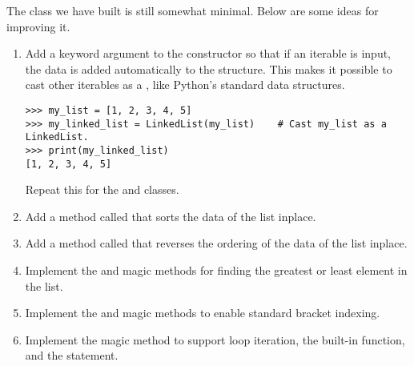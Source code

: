 The  class we have built is still somewhat minimal.
Below are some ideas for improving it.

\begin{enumerate}
\item Add a keyword argument to the constructor so that if an iterable is input, the data is added automatically to the structure.
This makes it possible to cast other iterables as a , like
Python's standard data structures.

\begin{lstlisting}
>>> my_list = [1, 2, 3, 4, 5]
>>> my_linked_list = LinkedList(my_list)    # Cast my_list as a LinkedList.
>>> print(my_linked_list)
[1, 2, 3, 4, 5]
\end{lstlisting}
Repeat this for the  and  classes.

\item Add a method called  that sorts the data of the list inplace.

\item Add a method called  that reverses the ordering of the data of the list inplace.

\item Implement the  and  magic methods for finding the greatest or least element in the list.

\item Implement the  and  magic methods to enable standard bracket indexing.

\item Implement the  magic method to support  loop iteration, the  built-in function, and the  statement.
\end{enumerate}

\begin{comment} %

\subsection*{Other Linked List} %


\subsection*{Stacks and Queues}
\begin{problem}[Optional]
Write \li{Stack} and \li{Queue} classes that inherit from the \li{Deque} class.
Add a \li{push()} method and overload the \li{pop()} method in each class to match the behaviors described in the preceding section.
Disable any other methods.
\end{problem}
\end{comment}
